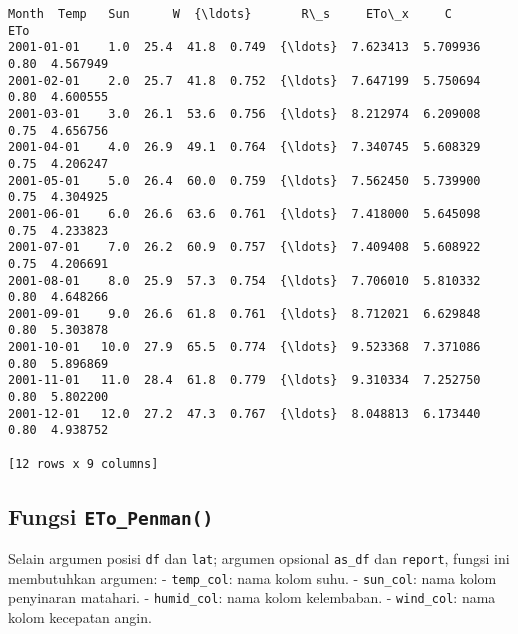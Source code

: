 \documentclass[11pt]{article}
\makeatletter
\newcommand{\boxspacing}{\kern\kvtcb@left@rule\kern\kvtcb@boxsep}
\newcommand{\prompt}[4]{
        {\ttfamily\llap{{\color{#2}[#3]:\hspace{3pt}#4}}\vspace{-\baselineskip}}
    }
\makeatother
\begin{document}
            \begin{tcolorbox}[breakable, size=fbox, boxrule=.5pt, pad at break*=1mm, opacityfill=0]
\prompt{Out}{outcolor}{ }{\boxspacing}
\begin{Verbatim}[commandchars=\\\{\}]
            Month  Temp   Sun      W  {\ldots}       R\_s     ETo\_x     C       ETo
2001-01-01    1.0  25.4  41.8  0.749  {\ldots}  7.623413  5.709936  0.80  4.567949
2001-02-01    2.0  25.7  41.8  0.752  {\ldots}  7.647199  5.750694  0.80  4.600555
2001-03-01    3.0  26.1  53.6  0.756  {\ldots}  8.212974  6.209008  0.75  4.656756
2001-04-01    4.0  26.9  49.1  0.764  {\ldots}  7.340745  5.608329  0.75  4.206247
2001-05-01    5.0  26.4  60.0  0.759  {\ldots}  7.562450  5.739900  0.75  4.304925
2001-06-01    6.0  26.6  63.6  0.761  {\ldots}  7.418000  5.645098  0.75  4.233823
2001-07-01    7.0  26.2  60.9  0.757  {\ldots}  7.409408  5.608922  0.75  4.206691
2001-08-01    8.0  25.9  57.3  0.754  {\ldots}  7.706010  5.810332  0.80  4.648266
2001-09-01    9.0  26.6  61.8  0.761  {\ldots}  8.712021  6.629848  0.80  5.303878
2001-10-01   10.0  27.9  65.5  0.774  {\ldots}  9.523368  7.371086  0.80  5.896869
2001-11-01   11.0  28.4  61.8  0.779  {\ldots}  9.310334  7.252750  0.80  5.802200
2001-12-01   12.0  27.2  47.3  0.767  {\ldots}  8.048813  6.173440  0.80  4.938752

[12 rows x 9 columns]
\end{Verbatim}
\end{tcolorbox}
        
    \hypertarget{fungsi-eto_penman}{%
\subsection{\texorpdfstring{Fungsi
\texttt{ETo\_Penman()}}{Fungsi ETo\_Penman()}}\label{fungsi-eto_penman}}

Selain argumen posisi \texttt{df} dan \texttt{lat}; argumen opsional
\texttt{as\_df} dan \texttt{report}, fungsi ini membutuhkan argumen: -
\texttt{temp\_col}: nama kolom suhu. - \texttt{sun\_col}: nama kolom
penyinaran matahari. - \texttt{humid\_col}: nama kolom kelembaban. -
\texttt{wind\_col}: nama kolom kecepatan angin.
\end{document}

